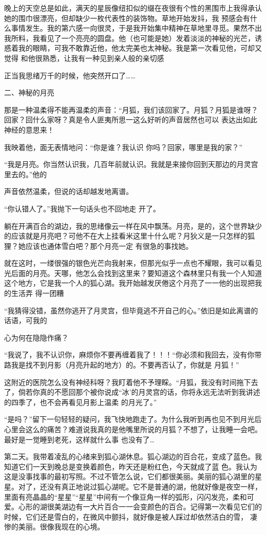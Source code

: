 \documentclass{article}
\begin{document}
晚上的天空总是如此，满天的星辰像纽扣似的缀在夜很有个性的黑围市上我得承认她的围巾很漂亮，但却缺少一枚代表性的装饰物。草地开始发抖，我
\newpage
预感会有什么事情发生。我的第六感一向很灵，于是我开始集中精神在草地里寻觅。果然不出我所料，我看见了一个亮亮的圆盘。他（也可能是她）发着淡淡的神秘的光芒，诱惑着我的眼睛，可我不敢靠近他，他太完美也太神秘。我是第一次看见他，可却又觉得
和他很熟悉，让我有一种见到亲人般的亲切感 


正当我思绪万千的时候，他突然开口了…… 


二、神秘的月亮 

那是一种温柔得不能再温柔的声音：“月狐，我们该回家了。月狐？月狐是谁呀？回家？回什么家呀？真是令人匪夷所思一这么好听的声音居然也可以
表达出如此神经的意思来！ 

我映着他，面无表情地问：“你是谁？我认识
你吗？回家，哪里是我的家？” 

“我是月亮。你当然认识我，几百年前就认识。我就是来接你回到天那边的月灵宫里去的。”他的
\newpage

声音依然温柔，但说的话却越发地离谱。 

“你认错人了。”我抛下一句话头也不回地走
开了。 

躺在开满百合的湖边，我的思绪像云一样在风中飘荡。月亮，是的，这个世界缺少的应该就是月亮吧？可他不在大上挂看米这里十什么呢？月狄义是一只怎样的狐狸？她应该也通体雪白吧？那个月亮一定
有很急的事找她。 

就在这时，一缕很强的银色光芒向我射来，但那光似乎一点也不耀眼，我可以看见光后面的月亮。天哪，他怎么会找到这里来？要知道这个森林里只有我一个人知道这个地方，它是我一个人的狐心湖。我开始越发厌倦这个月亮了一一他的出现把我的生活弄
得一团糟 

“我猜得没错，虽然你逃开了月灵宫，但毕竟逃不开自己的心。”依旧是如此离谱的话语，可我的

\newpage
心为何在隐隐作痛？ 

“我说了，我不认识你，麻烦你不要再缠着我了！！！“你必须和我回去，没有你带路我是找不到月影（月亮升起的地方）的。不要再否认了，你就是
月狐！” 

这附近的医院怎么没有神经科呀？我盯着他不予理睬。“月狐，我没有时间拖下去了，倘若你真的不愿回那个被你说成“冰’的月灵宫的话，你将永远无法听到我讲述的四季了，也不会再看见月影上温柔
的月光了。” 

“是吗？”留下一句轻轻的疑问，我飞快地跑走了。为什么我听到再也见不到月光后心里会这么的痛苦？难道说我真的是他嘴里所说的月狐？不想了，让我睡一会吧。最好是一觉睡到老死，这样就什么事
也没有了… 

第二天。我带着凌乱的心绪来到狐心湖休息。狐心湖边的百合花，变成了蓝色。我知道它们一天到晚总是变换着颜色，昨天还是粉红色，今天就成了蓝
\newpage
色。我认为这是没事找事的最初写照。不过不管怎么说，它们都很美丽。美丽的狐心湖里的星星。对了，还没有真正地说过狐心湖呢。它不是普通的湖，他就好像是夜空一样，里面有亮晶晶的“星星”“星星”中间有一个像豆角一样的弧形，闪闪发亮，柔和可爱。心形的湖很美湖边有一大片百合一一会变颜色的百合。记得第一次看见它们的时候，它们还是雪白的，在微风中颤抖，就好像是被人踩过却依然洁白的雪，
凄惨的美丽。很像我现在的心境。 
\end{document}
